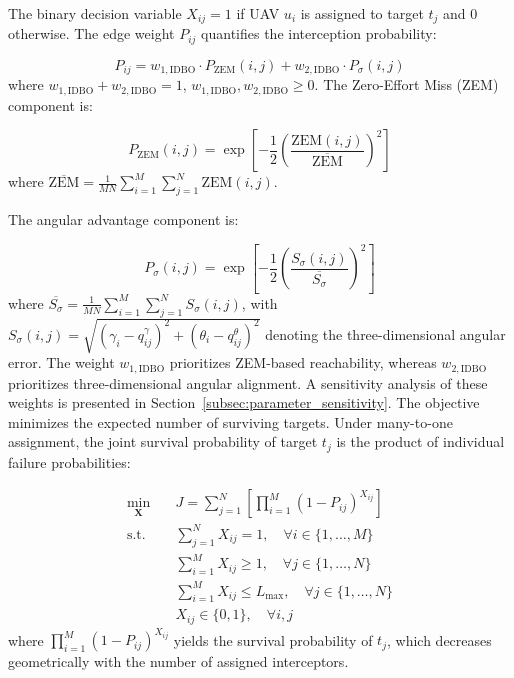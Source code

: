 \documentclass[lettersize,journal]{IEEEtran}
\begin{document}
The binary decision variable $X_{ij}=1$ if UAV $u_i$ is assigned to target $t_j$ and 0 otherwise. The edge weight $P_{ij}$ quantifies the interception probability:

\begin{equation}
\label{eq:interception_probability}
P_{ij} = w_{1,\mathrm{IDBO}} \cdot P_{\text{ZEM}}(i,j) + w_{2,\mathrm{IDBO}} \cdot P_{\sigma}(i,j)
\end{equation}
where $w_{1,\mathrm{IDBO}}+w_{2,\mathrm{IDBO}}=1$, $w_{1,\mathrm{IDBO}},w_{2,\mathrm{IDBO}}\geq0$. The Zero-Effort Miss (ZEM) component is:

\begin{equation}
\label{eq:zem_prob}
P_{\text{ZEM}}(i,j) = \exp\left[-\frac{1}{2}\left(\frac{\text{ZEM}(i,j)}{\overline{\text{ZEM}}}\right)^2\right]
\end{equation}
where $\overline{\text{ZEM}} = \frac{1}{MN}\sum_{i=1}^{M}\sum_{j=1}^{N} \text{ZEM}(i,j)$.

The angular advantage component is:

\begin{equation}
\label{eq:angular_prob}
P_{\sigma}(i,j) = \exp\left[-\frac{1}{2}\left(\frac{S_{\sigma}(i,j)}{\overline{S_{\sigma}}}\right)^2\right]
\end{equation}
where $\overline{S_{\sigma}} = \frac{1}{MN}\sum_{i=1}^{M}\sum_{j=1}^{N} S_{\sigma}(i,j)$, with $S_{\sigma}(i,j) = \sqrt{(\gamma_i - q_{ij}^{\gamma})^2 + (\theta_i - q_{ij}^{\theta})^2}$ denoting the three-dimensional angular error. 
The weight $w_{1,\mathrm{IDBO}}$ prioritizes ZEM-based reachability, whereas $w_{2,\mathrm{IDBO}}$ prioritizes three-dimensional angular alignment. A sensitivity analysis of these weights is presented in Section~\ref{subsec:parameter_sensitivity}.
The objective minimizes the expected number of surviving targets. Under many-to-one assignment, the joint survival probability of target $t_j$ is the product of individual failure probabilities:

\begin{equation}
\label{eq:optimization_formulation}
\begin{aligned}
\min_{\mathbf{X}} \quad & J = \sum_{j=1}^{N} \left[ \prod_{i=1}^{M} \left(1 - P_{ij}\right)^{X_{ij}} \right] \\
\text{s.t.} \quad & \sum_{j=1}^{N} X_{ij} = 1, \quad \forall i \in \{1,\dots,M\} \\
& \sum_{i=1}^{M} X_{ij} \geq 1, \quad \forall j \in \{1,\dots,N\} \\
& \sum_{i=1}^{M} X_{ij} \leq L_{\max}, \quad \forall j \in \{1,\dots,N\} \\
& X_{ij} \in \{0,1\}, \quad \forall i,j
\end{aligned}
\end{equation}
where $\prod_{i=1}^{M} (1 - P_{ij})^{X_{ij}}$ yields the survival probability of $t_j$, which decreases geometrically with the number of assigned interceptors.
\end{document}
